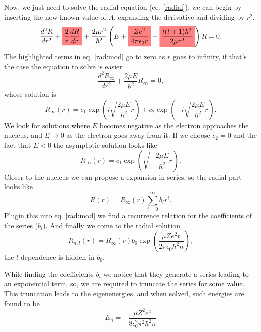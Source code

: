 \begin{questions}
\begin{solution}
  Now, we just need to solve the radial equation (eq. \ref{radial}), we can begin by inserting the now known value of $A$, expanding the derivative and dividing by $r^2$.
  \begin{eqnarray}
    \frac{d^2R}{dr^2} +\highlight{\frac{2}{r}\frac{dR}{dr}} + \frac{2\mu r^2}{\hbar^2}\left(E + \highlight{\frac{Ze^2}{4\pi\epsilon_0r }} - \highlight{\frac{l(l+1)\hbar^2}{2\mu r^2}} \right)R = 0.
    \label{rad:mod}
  \end{eqnarray}
  The highlighted terms in eq. \ref{rad:mod} go to zero as $r$ goes to infinity, if that's the case the equation to solve is easier
  \begin{equation}
    \frac{d^2R_\infty}{dr^2} + \frac{2\mu E}{\hbar^2}R_\infty = 0,
  \end{equation}
  whose solution is
  \begin{equation*}
    R_\infty(r) = c_1 \exp{\left(i\sqrt{\frac{2\mu E}{\hbar^2} r}\right)} + c_2 \exp{\left(-i\sqrt{\frac{2\mu E}{\hbar^2} r}\right)}.
  \end{equation*}
  We look for solutions where $E$ becomes negative as the electron approaches the nucleus, and $E\rightarrow0$ as the electron goes away from it. If we choose $c_2 = 0$ and the fact that $E<0$ the asymptotic solution looks like
  \begin{equation}
    R_\infty(r) = c_1 \exp{\left(\sqrt{-\frac{2\mu E}{\hbar^2} r}\right)} .
    \label{asym}
  \end{equation}
  Closer to the nucleus we can propose a expansion in series, so the radial part looks like
  \begin{equation}
    R(r) = R_\infty(r) \sum_{i=0}^\infty b_i r^i.
  \end{equation}
  Plugin this into eq. \ref{rad:mod} we find a recurrence relation for the coefficients of the series ($b_i$). And finally we come to the radial solution
  \begin{equation}
    R_{n,l}(r) = R_\infty(r) b_0 \exp \left(\frac{\mu Z e^2 r}{2\pi \epsilon_0 \hbar^2 n}\right),
  \end{equation}
  the $l$ dependence is hidden in $b_0$.

  While finding the coefficients $b_i$ we notice that they generate a series leading to an exponential term, so, we are required to truncate the series for some value. This truncation leads to the eigenenergies, and when solved, such energies are found to be
  \begin{equation}
    E_n = - \frac{\mu Z^2 e^4}{8\epsilon_0^2 \pi^2 \hbar^2 n}
  \end{equation}
\end{solution}


\end{questions}
